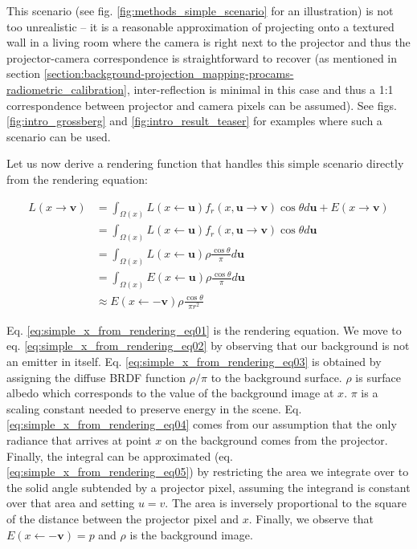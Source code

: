 This scenario (see fig. \ref{fig:methods_simple_scenario} for an illustration) is not too unrealistic -- it is a reasonable approximation of projecting onto a textured wall in a living room where the camera is right next to the projector and thus the projector-camera correspondence is straightforward to recover (as mentioned in section \ref{section:background-projection_mapping-procams-radiometric_calibration}, inter-reflection is minimal in this case and thus a 1:1 correspondence between projector and camera pixels can be assumed). See figs. \ref{fig:intro_grossberg} and \ref{fig:intro_result_teaser} for examples where such a scenario can be used.

Let us now derive a rendering function that handles this simple scenario directly from the rendering equation:

\begin{align}
    L(x \rightarrow \mathbf{v}) &= \int_{\Omega(x)} L(x \leftarrow \mathbf{u}) f_r(x, \mathbf{u} \rightarrow \mathbf{v}) \cos \theta d\mathbf{u} + E(x \rightarrow \mathbf{v}) \label{eq:simple_x_from_rendering_eq01} \\
    &= \int_{\Omega(x)} L(x \leftarrow \mathbf{u}) f_r(x, \mathbf{u} \rightarrow \mathbf{v}) \cos \theta d\mathbf{u} \label{eq:simple_x_from_rendering_eq02} \\
    &= \int_{\Omega(x)} L(x \leftarrow \mathbf{u}) \rho \frac{\cos \theta}{\pi} d\mathbf{u} \label{eq:simple_x_from_rendering_eq03} \\
    &= \int_{\Omega(x)} E(x \leftarrow \mathbf{u}) \rho \frac{\cos \theta}{\pi} d\mathbf{u} \label{eq:simple_x_from_rendering_eq04} \\
    &\approx E(x \leftarrow \mathbf{-v}) \rho \frac{\cos \theta}{\pi r^2} \label{eq:simple_x_from_rendering_eq05}
\end{align}

Eq. \ref{eq:simple_x_from_rendering_eq01} is the rendering equation. We move to eq. \ref{eq:simple_x_from_rendering_eq02} by observing that our background is not an emitter in itself. Eq. \ref{eq:simple_x_from_rendering_eq03} is obtained by assigning the diffuse BRDF function \(\rho / \pi\) to the background surface. \(\rho\) is surface albedo which corresponds to the value of the background image at \(x\). \(\pi\) is a scaling constant needed to preserve energy in the scene. Eq. \ref{eq:simple_x_from_rendering_eq04} comes from our assumption that the only radiance that arrives at point \(x\) on the background comes from the projector. Finally, the integral can be approximated (eq. \ref{eq:simple_x_from_rendering_eq05}) by restricting the area we integrate over to the solid angle subtended by a projector pixel, assuming the integrand is constant over that area and setting \(u = v\). The area is inversely proportional to the square of the distance between the projector pixel and \(x\). Finally, we observe that \(E(x \leftarrow \mathbf{-v}) = p\) and \(\rho\) is the background image.

